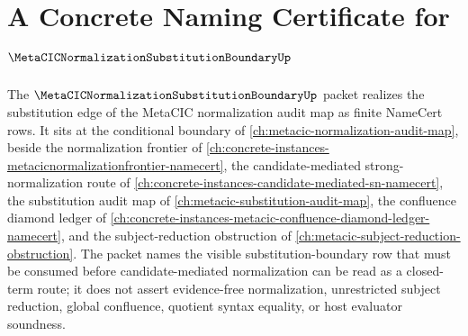 \chapter{A Concrete Naming Certificate for $\MetaCICNormalizationSubstitutionBoundaryUp$}
\label{ch:concrete-instances-metacic-normalization-substitution-boundary-namecert}

The $\MetaCICNormalizationSubstitutionBoundaryUp$ packet realizes the substitution edge of the MetaCIC normalization audit map as finite NameCert rows. It sits at the conditional boundary of \autoref{ch:metacic-normalization-audit-map}, beside the normalization frontier of \autoref{ch:concrete-instances-metacicnormalizationfrontier-namecert}, the candidate-mediated strong-normalization route of \autoref{ch:concrete-instances-candidate-mediated-sn-namecert}, the substitution audit map of \autoref{ch:metacic-substitution-audit-map}, the confluence diamond ledger of \autoref{ch:concrete-instances-metacic-confluence-diamond-ledger-namecert}, and the subject-reduction obstruction of \autoref{ch:metacic-subject-reduction-obstruction}. The packet names the visible substitution-boundary row that must be consumed before candidate-mediated normalization can be read as a closed-term route; it does not assert evidence-free normalization, unrestricted subject reduction, global confluence, quotient syntax equality, or host evaluator soundness.


